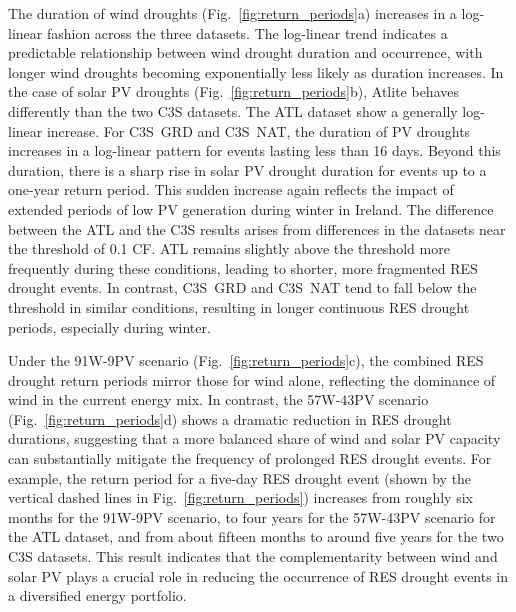 \documentclass[preprint, 12pt]{elsarticle}
\begin{document}
The duration of wind droughts (Fig.~\ref{fig:return_periods}a) increases in a log-linear fashion across the three datasets. The log-linear trend indicates a predictable relationship between wind drought duration and occurrence, with longer wind droughts becoming exponentially less likely as duration increases. In the case of solar PV droughts (Fig.~\ref{fig:return_periods}b), Atlite behaves differently than the two C3S datasets. The ATL dataset show a generally log-linear increase. For C3S~GRD and C3S~NAT, the duration of PV droughts increases in a log-linear pattern for events lasting less than 16 days. Beyond this duration, there is a sharp rise in solar PV drought duration for events up to a one-year return period. This sudden increase again reflects the impact of extended periods of low PV generation during winter in Ireland. The difference between the ATL and the C3S results arises from differences in the datasets near the threshold of 0.1 CF. ATL remains slightly above the threshold more frequently during these conditions, leading to shorter, more fragmented RES drought events. In contrast, C3S~GRD and C3S~NAT tend to fall below the threshold in similar conditions, resulting in longer continuous RES drought periods, especially during winter.

Under the 91W-9PV scenario (Fig.~\ref{fig:return_periods}c), the combined RES drought return periods mirror those for wind alone, reflecting the dominance of wind in the current energy mix. In contrast, the 57W-43PV scenario (Fig.~\ref{fig:return_periods}d) shows a dramatic reduction in RES drought durations, suggesting that a more balanced share of wind and solar PV capacity can substantially mitigate the frequency of prolonged RES drought events. For example, the return period for a five-day RES drought event (shown by the vertical dashed lines in Fig.~\ref{fig:return_periods}) increases from roughly six months for the 91W-9PV scenario, to four years for the 57W-43PV scenario for the ATL dataset, and from about fifteen months to around five years for the two C3S datasets. This result indicates that the complementarity between wind and solar PV plays a crucial role in reducing the occurrence of RES drought events in a diversified energy portfolio.
\end{document}
